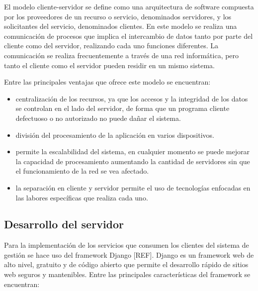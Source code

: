 El modelo cliente-servidor se define como una arquitectura
de software compuesta por los proveedores de un recurso o servicio, 
denominados servidores, y los solicitantes del servicio, denominados
clientes. En este modelo se realiza una comunicación de procesos
que implica el intercambio de datos tanto por parte del cliente 
como del servidor, realizando cada uno funciones diferentes. La comunicación
se realiza frecuentemente a través de una red informática, pero 
tanto el cliente como el servidor pueden residir en un mismo sistema.

Entre las principales ventajas que ofrece este modelo se encuentran:

\begin{itemize}
    \item centralización de los recursos, ya que los accesos y la integridad de los datos se controlan en el lado del servidor, de forma que un programa cliente defectuoso o no autorizado no puede dañar el sistema.
    \item división del procesamiento de la aplicación en varios dispositivos.
    \item permite la escalabilidad del sistema, en cualquier momento se puede mejorar la capacidad de procesamiento aumentando la cantidad de servidores sin que el funcionamiento de la red se vea afectado.
    \item la separación en cliente y servidor permite el uso de tecnologías enfocadas en las labores específicas que realiza cada uno. 
\end{itemize}
 


\subsection{Desarrollo del servidor}
Para la implementación de los servicios que consumen los clientes del 
sistema de gestión se hace uso del framework Django [REF]. Django es un framework
web de alto nivel, gratuito y de código abierto que permite el desarrollo rápido de 
sitios web seguros y mantenibles. Entre las principales características
del framework se encuentran:

